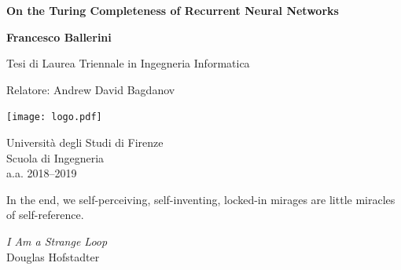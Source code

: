 \documentclass{book}
\theoremstyle{definition}
\theoremstyle{plain}
\theoremstyle{plain}
\theoremstyle{remark}
\theoremstyle{plain}
\begin{document}
	
	\frontmatter

	\begin{titlepage}
		\begin{center}
			\vspace*{1cm}
			
			\Huge
			\textbf{On the Turing Completeness of Recurrent Neural Networks}
			
			\vfill
			
			\huge
			\textbf{Francesco Ballerini}
			
			\vfill
			
			\LARGE
			Tesi di Laurea Triennale in Ingegneria Informatica
			
			\vspace{0.5cm}
			
			\Large
			Relatore: Andrew David Bagdanov
			
			\vfill
			
			\texttt{[image: logo.pdf]}
			
			\vfill
			
			\large
			Università degli Studi di Firenze\\
			Scuola di Ingegneria\\
			a.a. 2018--2019
		\end{center}
	\end{titlepage}
	
	\thispagestyle{empty}\mbox{}\clearpage
	
	\thispagestyle{empty}
	\epigraph{In the end, we self-perceiving, self-inventing, locked-in mirages are little miracles of self-reference.}
		{\textit{I Am a Strange Loop}\\Douglas Hofstadter}
	
\end{document}
